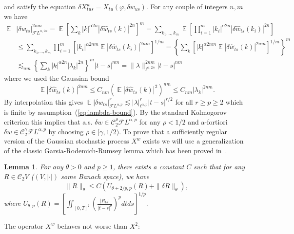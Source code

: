 \documentclass[a4paper,11pt,reqno]{article}
\DeclareMathOperator{\expect}{{\mathbb E}}
\newcommand{\der}{\delta}
\newcommand{\CC}{\mathcal{C}}
\newcommand{\FF}{\mathcal{F}}
\newcommand{\wh}{\widehat}
\newtheorem{lemma}[theorem]{Lemma}
\begin{document}
and satisfy the equation
$  \der X^w_{tus} = X_{tu}(\varphi,\der w_{us})
$.
For any couple of integers $n,m$ we have
\begin{equation}
\label{eq:w-norm-est}
\begin{split}
\expect & |\der w_{ts}|_{\FF L^{\alpha,2n}}^{2m n}  = \expect \left[ \sum_k |k|^{\alpha 2n} |\der \wh w_{ts}(k)|^{2n} \right]^{m} 
= \sum_{k_1,..,k_m}  \expect \left[\prod_{i=1}^m |k_i|^{\alpha 2n} |\der \wh w_{ts}(k_i)|^{2n} \right]
\\
& \le \sum_{k_1,..,k_m}  \prod_{i=1}^m   \left[|k_i|^{\alpha 2nm}\expect |\der \wh w_{ts}(k_i)|^{2nm} \right]^{1/m}
 = \left\{\sum_{k}   \left[|k|^{\alpha 2nm}\expect |\der \wh w_{ts}(k)|^{2nm} \right]^{1/m}\right\}^m
\\
& \lesssim_{nm} \left\{\sum_{k}  |k|^{\alpha 2n} |\lambda_k|^{2n}\right\}^m |t-s|^{nm} = \|\lambda\|_{\ell^{\alpha,2n}}^{2nm} |t-s|^{nm}
\end{split}
\end{equation}
where we used the Gaussian bound
$$
\expect |\der \wh w_{ts}(k)|^{2nm} \le C_{nm} \left(\expect |\der \wh w_{ts}(k)|^{2}\right)^{nm} \le C_{nm} |\lambda_k|^{2nm} .
$$
By interpolation this gives $\expect  |\der w_{ts}|_{\FF L^{\alpha,p}}^{r} \lesssim  |\lambda|_{\ell^{\alpha,p}}^{r} |t-s|^{r/2}$ for all $r\ge p \ge 2$ which is finite by assumption~(\ref{eq:lambda-bound}).
By the standard Kolmogorov criterion this implies that a.s. $\der w \in
\CC^{\rho}_2 \FF L^{\alpha,p}$ for any $\rho < 1/2$ and a-fortiori $\der w \in
\CC^{\gamma}_2 \FF L^{\alpha,p}$ by choosing $\rho \in [\gamma,1/2)$. 
To prove that a sufficiently regular version of the Gaussian stochastic process $X^w$ exists
we will use a generalization of the classic Garsia-Rodemich-Rumsey lemma
which has been proved in~\cite{MR2091358}.
\begin{lemma}
\label{lemma:besov}
For any $\theta > 0$ and $p \ge 1$,  there exists a constant
$C$ such that for any $R \in \CC_{2} V$ ($(V,|\cdot|)$ some Banach space), we have 
\begin{equation}
\label{eq:generalboundxx}
\|R\|_{\theta} \le C (U_{\theta+2/p,p}(R)+\|\der R\|_{\theta}),
\end{equation}
where
$
 U_{\theta,p}(R) = \left[ \iint_{[0,T]^2}
 \left(\frac{|R_{t s}|}{|t-s|^\theta}\right)^p dt ds \right]^{1/p}.
$
\end{lemma}

The operator $X^w$ behaves not worse than $X^2$: 
\end{document}
